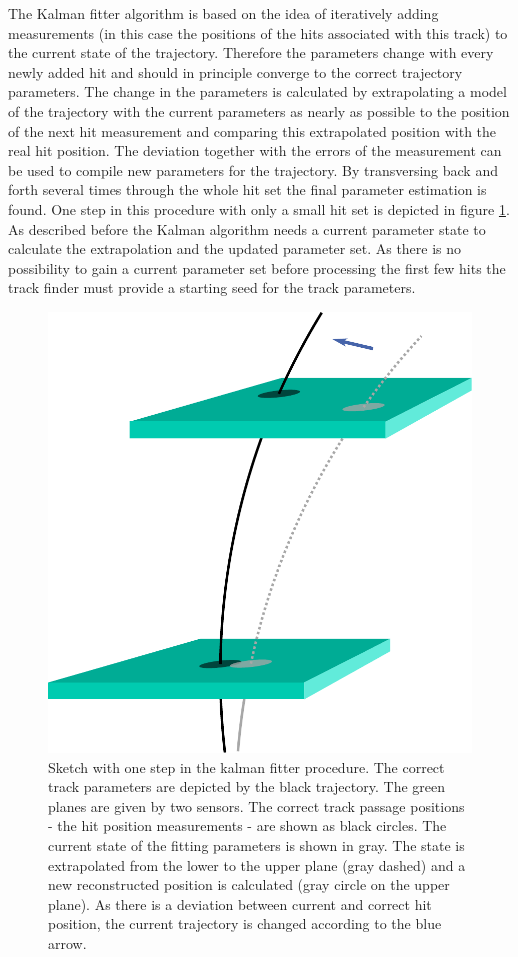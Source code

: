 The Kalman fitter algorithm \cite{kalman} is based on the idea of iteratively adding measurements (in this case the positions of the hits associated with this track) to the current state of the trajectory. Therefore the parameters change with every newly added hit and should in principle converge to the correct trajectory parameters. The change in the parameters is calculated by extrapolating a model of the trajectory with the current parameters as nearly as possible to the position of the next hit measurement and comparing this extrapolated position with the real hit position. The deviation together with the errors of the measurement can be used to compile new parameters for the trajectory. By transversing back and forth several times through the whole hit set the final parameter estimation is found. One step in this procedure with only a small hit set is depicted in figure \ref{fig-kalman}. As described before the Kalman algorithm needs a current parameter state to calculate the extrapolation and the updated parameter set. As there is no possibility to gain a current parameter set before processing the first few hits the track finder must provide a starting seed for the track parameters.

\begin{figure}
 \centering
 \includegraphics[width=0.6\linewidth]{figures/theory/kalman.pdf}
 \caption{Sketch with one step in the kalman fitter procedure. The correct track parameters are depicted by the black trajectory. The green planes are given by two sensors. The correct track passage positions - the hit position measurements - are shown as black circles. The current state of the fitting parameters is shown in gray. The state is extrapolated from the lower to the upper plane (gray dashed) and a new reconstructed position is calculated (gray circle on the upper plane). As there is a deviation between current and correct hit position, the current trajectory is changed according to the blue arrow.}
 \label{fig-kalman}
\end{figure}

